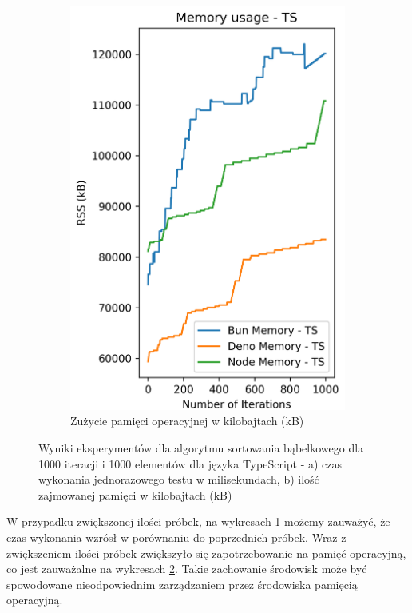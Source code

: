 \begin{figure}[H]
\begin{subfigure}[b]{0.44\textwidth}
    \label{fig:bubble_sorting_e2_ts_time}
  \end{subfigure}
  \begin{subfigure}[b]{0.44\textwidth}
    \centering
    \includegraphics[width=\textwidth]{Figures/sorting/sorting_bubble_1000_1000_ts_memory.png}
    \caption{Zużycie pamięci operacyjnej w kilobajtach (kB)}
    \label{fig:bubble_sorting_e2_ts_memory}
  \end{subfigure}
  \caption{Wyniki eksperymentów dla algorytmu sortowania bąbelkowego dla 1000 iteracji i 1000 elementów dla języka TypeScript - a) czas wykonania jednorazowego testu w milisekundach, b) ilość zajmowanej pamięci w kilobajtach (kB)}
  \label{fig:bubble_sorting_e2_ts}
\end{figure}

W przypadku zwiększonej ilości próbek, na wykresach \ref{fig:bubble_sorting_e2_ts_time} możemy zauważyć, że czas wykonania wzrósł w porównaniu do poprzednich próbek. Wraz z zwiększeniem ilości próbek zwiększyło się zapotrzebowanie na pamięć operacyjną, co jest zauważalne na wykresach \ref{fig:bubble_sorting_e2_ts_memory}. Takie zachowanie środowisk może być spowodowane nieodpowiednim zarządzaniem przez środowiska pamięcią operacyjną.

